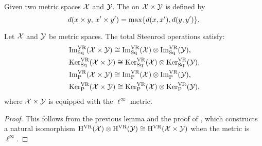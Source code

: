 Given two metric spaces $\cX$ and $\cY$.
The  on $\cX \times \cY$ is defined by
\[
d(x \times y, \, x' \times y') = \max\set{d(x,x'), d(y,y')}.
\]

\medskip\theorem
Let $\cX$ and $\cY$ be metric spaces.
The total Steenrod operations satisfy:
\begin{align*}
	&\img^{\VR}_\Sq(\cX \times \cY) \cong \img^{\VR}_\Sq(\cX) \ot \img^{\VR}_\Sq(\cY), \\
	&\ker^{\VR}_\Sq(\cX \times \cY) \cong \ker^{\VR}_\Sq(\cX) \ot \ker^{\VR}_\Sq(\cY), \\
	&\img^{\VR}_\rP(\cX \times \cY) \cong \img^{\VR}_\rP(\cX) \ot \img^{\VR}_\rP(\cY), \\
	&\ker^{\VR}_\rP(\cX \times \cY) \cong \ker^{\VR}_\rP(\cX) \ot \ker^{\VR}_\rP(\cY),
\end{align*}
where \(\cX \times \cY\) is equipped with the \(\ell^\infty\) metric.


\begin{proof}
	This follows from the previous lemma and the proof of \cite[Thm.~6.1(1)]{lim2024vietoris}, which constructs a natural isomorphism $\rH^\VR(\cX) \ot \rH^\VR(\cY) \cong \rH^\VR(\cX \times \cY)$ when the metric is \(\ell^\infty\).
\end{proof}